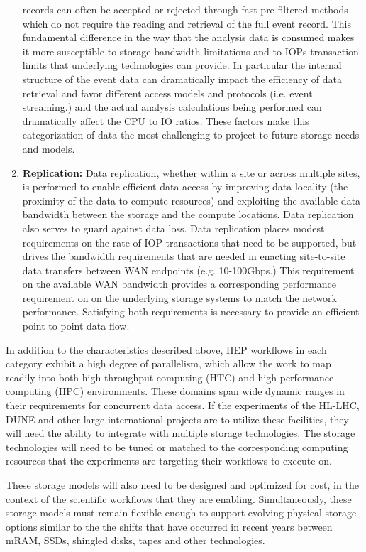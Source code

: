 \documentclass[12pt,a4paper]{article}
\begin{document}
\begin{enumerate}
  records can often be accepted or rejected through fast pre-filtered
  methods which do not require the reading and retrieval of the full
  event record. This fundamental difference in the way that the analysis
  data is consumed makes it more susceptible to storage bandwidth
  limitations and to IOPs transaction limits that underlying
  technologies can provide. In particular the internal structure of the
  event data can dramatically impact the efficiency of data retrieval
  and favor different access models and protocols (i.e. event
  streaming.) and the actual analysis calculations being performed can
  dramatically affect the CPU to IO ratios. These factors make this
  categorization of data the most challenging to project to future
  storage needs and models.
\item \textbf{Replication:} Data replication, whether within a site or
  across multiple sites, is performed to enable efficient data access by
  improving data locality (the proximity of the data to compute
  resources) and exploiting the available data bandwidth between the
  storage and the compute locations. Data replication also serves to
  guard against data loss. Data replication places modest requirements
  on the rate of IOP transactions that need to be supported, but drives
  the bandwidth requirements that are needed in enacting site-to-site
  data transfers between WAN endpoints (e.g. 10-100Gbps.) This
  requirement on the available WAN bandwidth provides a corresponding
  performance requirement on on the underlying storage systems to match
  the network performance. Satisfying both requirements is necessary to
  provide an efficient point to point data flow.
\end{enumerate}

In addition to the characteristics described above, HEP workflows in
each category exhibit a high degree of parallelism, which allow the work
to map readily into both high throughput computing (HTC) and high
performance computing (HPC) environments. These domains span wide
dynamic ranges in their requirements for concurrent data access. If the
experiments of the HL-LHC, DUNE and other large international projects
are to utilize these facilities, they will need the ability to integrate
with multiple storage technologies. The storage technologies will need
to be tuned or matched to the corresponding computing resources that the
experiments are targeting their workflows to execute on.

These storage models will also need to be designed and optimized for
cost, in the context of the scientific workflows that they are enabling.
Simultaneously, these storage models must remain flexible enough to
support evolving physical storage options similar to the the shifts that
have occurred in recent years between mRAM, SSDs, shingled disks, tapes
and other technologies. ~
\end{document}
